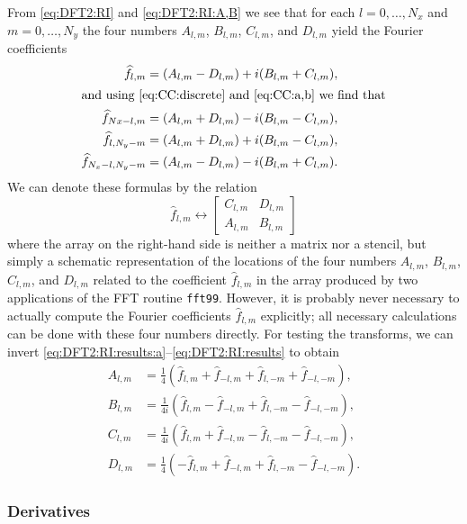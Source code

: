 \documentclass[12pt]{article}
\newcommand{\dfc}[1]{\widehat{#1}}  %
\newcommand{\Fc}[1]{\dfc{#1}}       %
\newcommand{\code}[1]{\texttt{#1}}
\begin{document}
From \eqref{eq:DFT2:RI} and \eqref{eq:DFT2:RI:A,B} we see that for each
$l=0,\dots,N_x$ and $m=0,\dots,N_y$ the four numbers $A_{l,m}$, $B_{l,m}$,
$C_{l,m}$, and $D_{l,m}$ yield the Fourier coefficients
\begin{align}
   \Fc{f}_{l,m} &= (A_{l,m} - D_{l,m}) + i(B_{l,m} + C_{l,m}) ,
\label{eq:DFT2:RI:results:a}
\\
\intertext{and using \eqref{eq:CC:discrete} and \eqref{eq:CC:a,b} we find that}
   \Fc{f}_{Nx-l,m} &= (A_{l,m} + D_{l,m}) - i(B_{l,m} - C_{l,m}) ,
\\
   \Fc{f}_{l,N_y-m} &= (A_{l,m} + D_{l,m}) + i(B_{l,m} - C_{l,m}) ,
\\
   \Fc{f}_{N_x-l,N_y-m} &= (A_{l,m} - D_{l,m}) - i(B_{l,m} + C_{l,m}) .
\label{eq:DFT2:RI:results}
\end{align}
We can denote these formulas by the relation
\begin{equation}
   \Fc{f}_{l,m} \leftrightarrow
   \begin{bmatrix} C_{l,m} & D_{l,m} \\ A_{l,m} & B_{l,m} \end{bmatrix}
\label{eq:DFC:matrix}
\end{equation}
where the array on the right-hand side is neither a matrix nor a stencil, but
simply a schematic representation of the locations of the four numbers
$A_{l,m}$, $B_{l,m}$, $C_{l,m}$, and $D_{l,m}$ related to the coefficient
$\Fc{f}_{l,m}$ in the array produced by two applications of the FFT routine
\code{fft99}.
However, it is probably never necessary to actually compute the Fourier
coefficients $\Fc{f}_{l,m}$ explicitly; all necessary calculations can be done
with these four numbers directly.  For testing the transforms, we can invert
\eqref{eq:DFT2:RI:results:a}--\eqref{eq:DFT2:RI:results} to obtain
\begin{align}
   A_{l,m} &= \frac{1}{4}\left(
      \Fc{f}_{l,m} + \Fc{f}_{-l,m} + \Fc{f}_{l,-m} + \Fc{f}_{-l,-m} \right) ,
\\
   B_{l,m} &= \frac{1}{4i}\left(
      \Fc{f}_{l,m} - \Fc{f}_{-l,m} + \Fc{f}_{l,-m} - \Fc{f}_{-l,-m} \right) ,
\\
   C_{l,m} &= \frac{1}{4i}\left(
      \Fc{f}_{l,m} + \Fc{f}_{-l,m} - \Fc{f}_{l,-m} - \Fc{f}_{-l,-m} \right) ,
\\
   D_{l,m} &= \frac{1}{4}\left(
     -\Fc{f}_{l,m} + \Fc{f}_{-l,m} + \Fc{f}_{l,-m} - \Fc{f}_{-l,-m} \right) .
\label{eq:DFT2:inverted}
\end{align}

\subsubsection{Derivatives}
\end{document}
